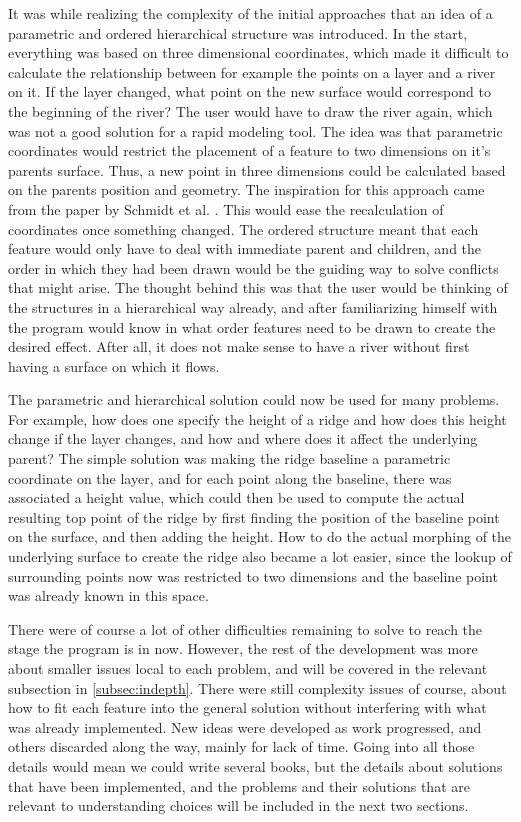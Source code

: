 \documentclass[a4paper,12pt]{report}
\begin{document}
It was while realizing the complexity of the initial approaches that an idea of a parametric and ordered hierarchical structure was introduced. In the start, everything was based on three dimensional coordinates, which made it difficult to calculate the relationship between for example the points on a layer and a river on it. If the layer changed, what point on the new surface would correspond to the beginning of the river? The user would have to draw the river again, which was not a good solution for a rapid modeling tool. The idea was that parametric coordinates would restrict the placement of a feature to two dimensions on it's parents surface. Thus, a new point in three dimensions could be calculated based on the parents position and geometry. The inspiration for this approach came from the paper by Schmidt et al. \cite{CGF:CGF1129}. This would ease the recalculation of coordinates once something changed. The ordered structure meant that each feature would only have to deal with immediate parent and 
children, and the order in which they had been drawn would be the guiding way to solve conflicts that might arise. The thought behind this was that the user would be thinking of the structures in a hierarchical way already, and after familiarizing himself with the program would know in what order features need to be drawn to create the desired effect. After all, it does not make sense to have a river without first having a surface on which it flows.

The parametric and hierarchical solution could now be used for many problems. For example, how does one specify the height of a ridge and how does this height change if the layer changes, and how and where does it affect the underlying parent? The simple solution was making the ridge baseline a parametric coordinate on the layer, and for each point along the baseline, there was associated a height value, which could then be used to compute the actual resulting top point of the ridge by first finding the position of the baseline point on the surface, and then adding the height. How to do the actual morphing of the underlying surface to create the ridge also became a lot easier, since the lookup of surrounding points now was restricted to two dimensions and the baseline point was already known in this space.

There were of course a lot of other difficulties remaining to solve to reach the stage the program is in now. However, the rest of the development was more about smaller issues local to each problem, and will be covered in the relevant subsection in \ref{subsec:indepth}.  There were still complexity issues of course, about how to fit each feature into the general solution without interfering with what was already implemented. New ideas were developed as work progressed, and others discarded along the way, mainly for lack of time. Going into all those details would mean we could write several books, but the details about solutions that have been implemented, and the problems and their solutions that are relevant to understanding choices will be included in the next two sections.
\end{document}
